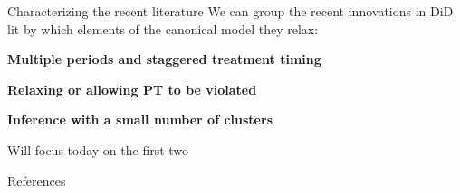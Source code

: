 \documentclass[aspectratio = 169, 12pt]{beamer}
\begin{document}
\begin{frame}{Characterizing the recent literature}
  We can group the recent innovations in DiD lit by which elements of the canonical model they relax:
  \medskip

  \begin{wideitemize}
    \item
    \textbf{Multiple periods and staggered treatment timing}

    \item
    \textbf{Relaxing or allowing PT to be violated}

    \item
    \textbf{Inference with a small number of clusters}

  \end{wideitemize}
  \medskip
  Will focus today on the first two
\end{frame}


\backupbegin
\begin{frame}{References}
  
\end{frame}
\backupend
\end{document}
